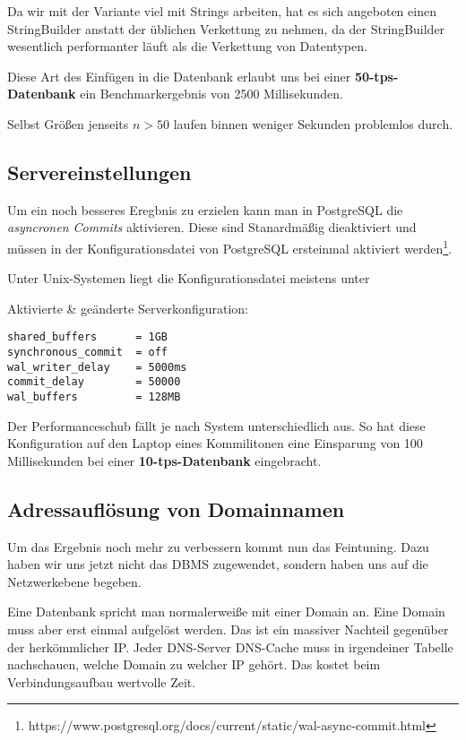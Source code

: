 Da wir mit der Variante viel mit Strings arbeiten, hat es sich angeboten einen
StringBuilder anstatt der üblichen Verkettung zu nehmen, da der StringBuilder
wesentlich performanter läuft als die Verkettung von Datentypen.

Diese Art des Einfügen in die Datenbank erlaubt uns bei einer
\textbf{50-tps-Datenbank} ein Benchmarkergebnis von 2500 Millisekunden.

Selbst Größen jenseits $n > 50$ laufen binnen weniger Sekunden problemlos durch.

\subsection{Servereinstellungen}

Um ein noch besseres Eregbnis zu erzielen kann man in PostgreSQL die
\textit{asyncronen Commits} aktivieren. Diese sind Stanardmäßig dieaktiviert und
müssen in der Konfigurationsdatei von PostgreSQL ersteinmal aktiviert werden\footnote{https://www.postgresql.org/docs/current/static/wal-async-commit.html}.

Unter Unix-Systemen liegt die Konfigurationsdatei meistens unter \newline
{}

Aktivierte \& geänderte Serverkonfiguration:
\begin{lstlisting}[title={Veränderte Serverkonfiguration}]
shared_buffers		= 1GB
synchronous_commit	= off
wal_writer_delay	= 5000ms
commit_delay		= 50000
wal_buffers			= 128MB
\end{lstlisting}

Der Performanceschub fällt je nach System unterschiedlich aus. So hat diese
Konfiguration auf den Laptop eines Kommilitonen eine Einsparung von 100
Millisekunden bei einer \textbf{10-tps-Datenbank} eingebracht.

\subsection{Adressauflösung von Domainnamen}
Um das Ergebnis noch mehr zu verbessern kommt nun das Feintuning. Dazu
haben wir uns jetzt nicht das DBMS zugewendet, sondern haben uns auf die
Netzwerkebene begeben.

Eine Datenbank spricht man normalerweiße mit einer Domain an. 
Eine Domain muss aber erst einmal aufgelöst werden.
Das ist ein massiver Nachteil gegenüber der herkömmlicher IP. Jeder
DNS-Server \bzw DNS-Cache muss in irgendeiner Tabelle nachschauen, welche Domain
zu welcher IP gehört. Das kostet beim Verbindungsaufbau wertvolle Zeit.

